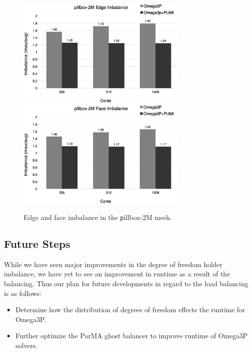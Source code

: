 \documentclass[review,12pt]{elsarticle_summary_report}
\begin{document}
\begin{figure}[!ph]
\centering
  \includegraphics[width=0.75\textwidth]{pillbox2M-edge-imb.eps} \\
  \includegraphics[width=0.75\textwidth]{pillbox2M-face-imb.eps}
  \caption{\label{fig:pillboximb} Edge and face imbalance in the {\texttt
  pillbox-2M}
  mesh.}
\end{figure}

\subsection{\label{load_balance_future} Future Steps}
While we have seen major improvements in the degree of freedom holder imbalance,
we have yet to see an improvement in runtime as a result of the balancing. Thus
our plan for future developments in regard to the load balancing  is as follows:

\begin{itemize}
  \item Determine how the distribution of degrees of freedom effects the runtime for Omega3P.
  \item Further optimize the ParMA ghost balancer to improve runtime of Omega3P solvers.
\end{itemize}
\end{document}

